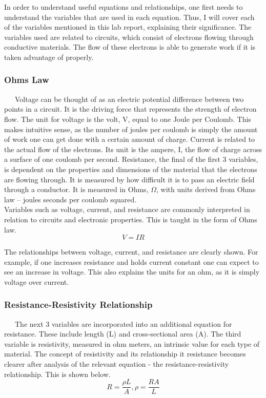 \documentclass[11pt]{article}
\begin{document}
In order to understand useful equations and relationships, one first needs to understand the variables that are used in each equation. Thus, I will cover each of the variables mentioned in this lab report, explaining their significance. The variables used are related to circuits, which consist of electrons flowing through conductive materials. The flow of these electrons is able to generate work if it is taken advantage of properly.

\subsubsection*{Ohms Law}
\ \ \ Voltage can be thought of as an electric potential difference between two points in a circuit. It is the driving force that represents the strength of electron flow. The unit for voltage is the volt, V, equal to one Joule per Coulomb. This makes intuitive sense, as the number of joules per coulomb is simply the amount of work one can get done with a certain amount of charge. Current is related to the actual flow of the electrons. Its unit is the ampere, I, the flow of charge across a surface of one coulomb per second. Resistance, the final of the first 3 variables, is dependent on the properties and dimensions of the material that the electrons are flowing through. It is measured by how difficult it is to pass an electric field through a conductor. It is measured in Ohms, $\Omega$, with units derived from Ohms law – joules seconds per coulomb squared.\\

Variables such as voltage, current, and resistance are commonly interpreted in relation to circuits and electronic properties. This is taught in the form of Ohms law.
\begin{equation}
V = IR
\end{equation}

The relationships between voltage, current, and resistance are clearly shown. For example, if one increases resistance and holds current constant one can expect to see an increase in voltage. This also explains the units for an ohm, as it is simply voltage over current.

\subsubsection*{Resistance-Resistivity Relationship}
\ \ \ The next 3 variables are incorporated into an additional equation for resistance. These include length (L) and cross-sectional area (A). The third variable is resistivity, measured in ohm meters, an intrinsic value for each type of material. The concept of resistivity and its relationship it resistance becomes clearer after analysis of the relevant equation - the resistance-resistivity relationship. This is shown below.
\begin{equation}
R = \frac{\rho L}{A}, \rho = \frac{RA}{L}
\end{equation}
\end{document}
